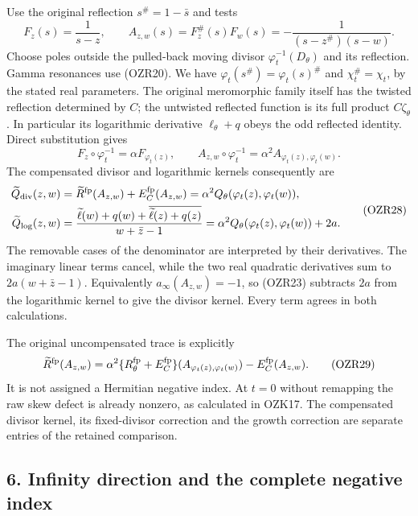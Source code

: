 \documentclass[
  10pt,
  a4paper,
]{article}
\begin{document}
Use the original reflection \(s^\#=1-\bar s\) and tests \[
F_z(s)=\frac1{s-z},\qquad
A_{z,w}(s)=F_z^\#(s)F_w(s)
=-\frac1{(s-z^\#)(s-w)}.
\tag{OZR26}
\] Choose poles outside the pulled-back moving divisor
\(\varphi_t^{-1}(D_\theta)\) and its reflection. Gamma resonances use
(OZR20). We have \(\varphi_t(s^\#)=\varphi_t(s)^\#\) and
\(\chi_t^\#=\chi_t\), by the stated real parameters. The original
meromorphic family itself has the twisted reflection determined by
\(C\); the untwisted reflected function is its full product
\(C\zeta_\theta\). In particular its logarithmic derivative
\(\ell_\theta+q\) obeys the odd reflected identity. Direct substitution
gives \[
F_z\circ\varphi_t^{-1}=\alpha F_{\varphi_t(z)},\qquad
A_{z,w}\circ\varphi_t^{-1}=\alpha^2A_{\varphi_t(z),\varphi_t(w)}.
\tag{OZR27}
\] The compensated divisor and logarithmic kernels consequently are \[
\begin{aligned}
\widetilde Q_{\rm div}(z,w)
&=\widetilde R^{\rm fp}(A_{z,w})+E_C^{\rm fp}(A_{z,w})
=\alpha^2Q_\theta(\varphi_t(z),\varphi_t(w)),\\
\widetilde Q_{\log}(z,w)
&=\frac{\widetilde\ell(w)+q(w)
 +\overline{\widetilde\ell(z)+q(z)}}{w+\bar z-1}
=\alpha^2Q_\theta(\varphi_t(z),\varphi_t(w))+2a.
\end{aligned}\tag{OZR28}
\] The removable cases of the denominator are interpreted by their
derivatives. The imaginary linear terms cancel, while the two real
quadratic derivatives sum to \(2a(w+\bar z-1)\). Equivalently
\(a_\infty(A_{z,w})=-1\), so (OZR23) subtracts \(2a\) from the
logarithmic kernel to give the divisor kernel. Every term agrees in both
calculations.

The original uncompensated trace is explicitly \[
\widetilde R^{\rm fp}(A_{z,w})=
\alpha^2\{R_\theta^{\rm fp}+E_C^{\rm fp}\}
(A_{\varphi_t(z),\varphi_t(w)})-E_C^{\rm fp}(A_{z,w}).
\tag{OZR29}
\] It is not assigned a Hermitian negative index. At \(t=0\) without
remapping the raw skew defect is already nonzero, as calculated in
OZK17. The compensated divisor kernel, its fixed-divisor correction and
the growth correction are separate entries of the retained comparison.

\subsection{6. Infinity direction and the complete negative
index}\label{infinity-direction-and-the-complete-negative-index}
\end{document}
